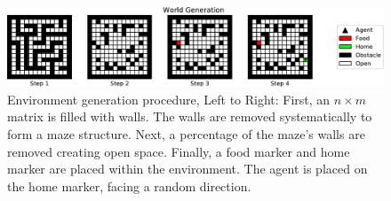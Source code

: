 \begin{figure}
\begin{center}
\includegraphics[width=\textwidth]{img/world_explanatory}
\caption{
Environment generation procedure, Left to Right: First, an $n \times m$ matrix is filled with walls. The walls are removed systematically to form a maze structure. Next, a percentage of the maze's walls are removed creating open space. Finally, a food marker and home marker are placed within the environment. The agent is placed on the home marker, facing a random direction.
}
\label{fig:world_explanatory}
\end{center}
\end{figure}
